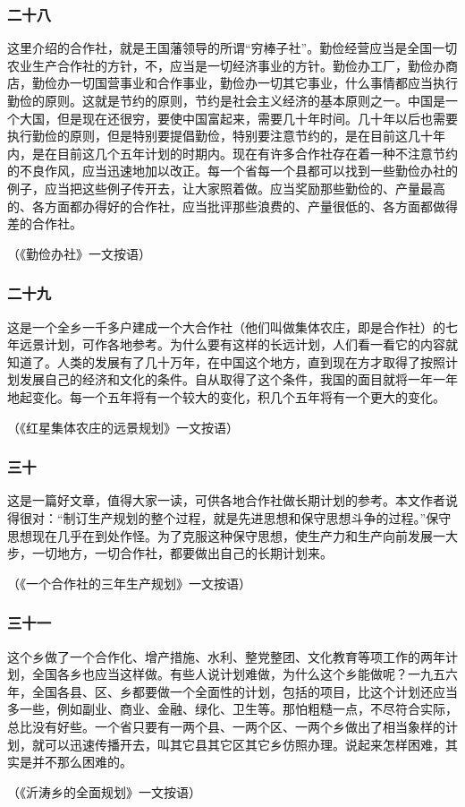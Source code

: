 \documentclass[cn,11pt,chinese]{elegantbook}
\def\myformat#1{\hfil\hfil #1}
\begin{document}
\subsubsection*{\myformat{二十八}}
这里介绍的合作社，就是王国藩领导的所谓“穷棒子社”。勤俭经营应当是全国一切农业生产合作社的方针，不，应当是一切经济事业的方针。勤俭办工厂，勤俭办商店，勤俭办一切国营事业和合作事业，勤俭办一切其它事业，什么事情都应当执行勤俭的原则。这就是节约的原则，节约是社会主义经济的基本原则之一。中国是一个大国，但是现在还很穷，要使中国富起来，需要几十年时间。几十年以后也需要执行勤俭的原则，但是特别要提倡勤俭，特别要注意节约的，是在目前这几十年内，是在目前这几个五年计划的时期内。现在有许多合作社存在着一种不注意节约的不良作风，应当迅速地加以改正。每一个省每一个县都可以找到一些勤俭办社的例子，应当把这些例子传开去，让大家照着做。应当奖励那些勤俭的、产量最高的、各方面都办得好的合作社，应当批评那些浪费的、产量很低的、各方面都做得差的合作社。\\
\begin{flushright}（《勤俭办社》一文按语）\end{flushright}
\subsubsection*{\myformat{二十九}}
这是一个全乡一千多户建成一个大合作社（他们叫做集体农庄，即是合作社）的七年远景计划，可作各地参考。为什么要有这样的长远计划，人们看一看它的内容就知道了。人类的发展有了几十万年，在中国这个地方，直到现在方才取得了按照计划发展自己的经济和文化的条件。自从取得了这个条件，我国的面目就将一年一年地起变化。每一个五年将有一个较大的变化，积几个五年将有一个更大的变化。\\
\begin{flushright}（《红星集体农庄的远景规划》一文按语）\end{flushright}
\subsubsection*{\myformat{三十}}
这是一篇好文章，值得大家一读，可供各地合作社做长期计划的参考。本文作者说得很对：“制订生产规划的整个过程，就是先进思想和保守思想斗争的过程。”保守思想现在几乎在到处作怪。为了克服这种保守思想，使生产力和生产向前发展一大步，一切地方，一切合作社，都要做出自己的长期计划来。\\
\begin{flushright}（《一个合作社的三年生产规划》一文按语）\end{flushright}
\subsubsection*{\myformat{三十一}}
这个乡做了一个合作化、增产措施、水利、整党整团、文化教育等项工作的两年计划，全国各乡也应当这样做。有些人说计划难做，为什么这个乡能做呢？一九五六年，全国各县、区、乡都要做一个全面性的计划，包括的项目，比这个计划还应当多一些，例如副业、商业、金融、绿化、卫生等。那怕粗糙一点，不尽符合实际，总比没有好些。一个省只要有一两个县、一两个区、一两个乡做出了相当象样的计划，就可以迅速传播开去，叫其它县其它区其它乡仿照办理。说起来怎样困难，其实是并不那么困难的。\\
\begin{flushright}（《沂涛乡的全面规划》一文按语）\end{flushright}
\end{document}
